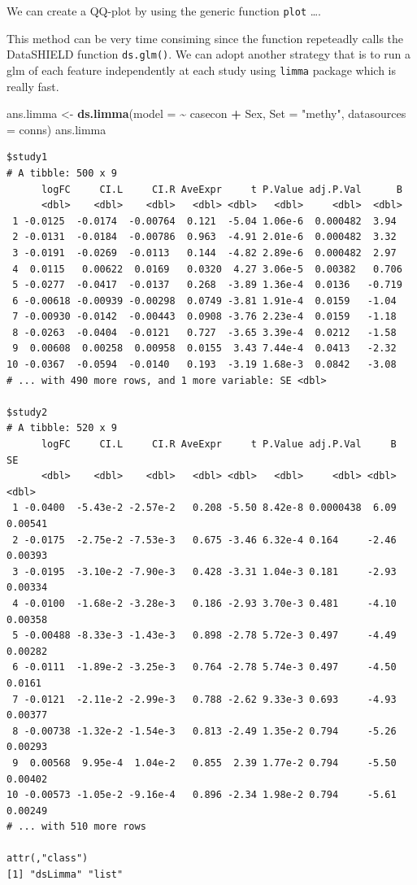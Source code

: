 \documentclass[]{article}
\newenvironment{Shaded}{\begin{snugshade}}{\end{snugshade}}
\newcommand{\DataTypeTok}[1]{\textcolor[rgb]{0.13,0.29,0.53}{#1}}
\newcommand{\KeywordTok}[1]{\textcolor[rgb]{0.13,0.29,0.53}{\textbf{#1}}}
\newcommand{\NormalTok}[1]{#1}
\newcommand{\OperatorTok}[1]{\textcolor[rgb]{0.81,0.36,0.00}{\textbf{#1}}}
\newcommand{\StringTok}[1]{\textcolor[rgb]{0.31,0.60,0.02}{#1}}
\begin{document}
We can create a QQ-plot by using the generic function \texttt{plot}
\ldots.

This method can be very time consiming since the function repeteadly
calls the DataSHIELD function \texttt{ds.glm()}. We can adopt another
strategy that is to run a glm of each feature independently at each
study using \texttt{limma} package which is really fast.

\begin{Shaded}
\begin{Highlighting}[]
\NormalTok{ans.limma <{-}}\StringTok{ }\KeywordTok{ds.limma}\NormalTok{(}\DataTypeTok{model =} \OperatorTok{\textasciitilde{}}\StringTok{ }\NormalTok{casecon }\OperatorTok{+}\StringTok{ }\NormalTok{Sex,}
                      \DataTypeTok{Set =} \StringTok{"methy"}\NormalTok{, }
                      \DataTypeTok{datasources =}\NormalTok{ conns)}
\NormalTok{ans.limma}
\end{Highlighting}
\end{Shaded}

\begin{verbatim}
$study1
# A tibble: 500 x 9
      logFC     CI.L     CI.R AveExpr     t P.Value adj.P.Val      B
      <dbl>    <dbl>    <dbl>   <dbl> <dbl>   <dbl>     <dbl>  <dbl>
 1 -0.0125  -0.0174  -0.00764  0.121  -5.04 1.06e-6  0.000482  3.94 
 2 -0.0131  -0.0184  -0.00786  0.963  -4.91 2.01e-6  0.000482  3.32 
 3 -0.0191  -0.0269  -0.0113   0.144  -4.82 2.89e-6  0.000482  2.97 
 4  0.0115   0.00622  0.0169   0.0320  4.27 3.06e-5  0.00382   0.706
 5 -0.0277  -0.0417  -0.0137   0.268  -3.89 1.36e-4  0.0136   -0.719
 6 -0.00618 -0.00939 -0.00298  0.0749 -3.81 1.91e-4  0.0159   -1.04 
 7 -0.00930 -0.0142  -0.00443  0.0908 -3.76 2.23e-4  0.0159   -1.18 
 8 -0.0263  -0.0404  -0.0121   0.727  -3.65 3.39e-4  0.0212   -1.58 
 9  0.00608  0.00258  0.00958  0.0155  3.43 7.44e-4  0.0413   -2.32 
10 -0.0367  -0.0594  -0.0140   0.193  -3.19 1.68e-3  0.0842   -3.08 
# ... with 490 more rows, and 1 more variable: SE <dbl>

$study2
# A tibble: 520 x 9
      logFC     CI.L     CI.R AveExpr     t P.Value adj.P.Val     B      SE
      <dbl>    <dbl>    <dbl>   <dbl> <dbl>   <dbl>     <dbl> <dbl>   <dbl>
 1 -0.0400  -5.43e-2 -2.57e-2   0.208 -5.50 8.42e-8 0.0000438  6.09 0.00541
 2 -0.0175  -2.75e-2 -7.53e-3   0.675 -3.46 6.32e-4 0.164     -2.46 0.00393
 3 -0.0195  -3.10e-2 -7.90e-3   0.428 -3.31 1.04e-3 0.181     -2.93 0.00334
 4 -0.0100  -1.68e-2 -3.28e-3   0.186 -2.93 3.70e-3 0.481     -4.10 0.00358
 5 -0.00488 -8.33e-3 -1.43e-3   0.898 -2.78 5.72e-3 0.497     -4.49 0.00282
 6 -0.0111  -1.89e-2 -3.25e-3   0.764 -2.78 5.74e-3 0.497     -4.50 0.0161 
 7 -0.0121  -2.11e-2 -2.99e-3   0.788 -2.62 9.33e-3 0.693     -4.93 0.00377
 8 -0.00738 -1.32e-2 -1.54e-3   0.813 -2.49 1.35e-2 0.794     -5.26 0.00293
 9  0.00568  9.95e-4  1.04e-2   0.855  2.39 1.77e-2 0.794     -5.50 0.00402
10 -0.00573 -1.05e-2 -9.16e-4   0.896 -2.34 1.98e-2 0.794     -5.61 0.00249
# ... with 510 more rows

attr(,"class")
[1] "dsLimma" "list"   
\end{verbatim}
\end{document}
